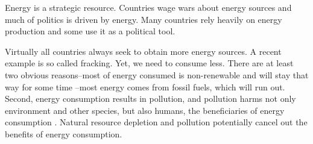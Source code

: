 \documentclass[10pt, letterpaper]{article}
\begin{document}
\begin{spacing}{1.4}

 Energy is a strategic
resource. Countries wage wars about energy sources  and much of politics is
driven by energy. %
Many  countries rely heavily on energy production
and some use it as a political tool.%

Virtually all countries  always seek to obtain more energy sources. A recent example is so called
fracking. Yet, we need to consume less. There are at least two
obvious reasons--most of energy consumed  is non-renewable and will stay
that way for some time \cite{mackay08}--most energy comes from
fossil fuels, which will run out. %
Second, energy consumption results in pollution, and pollution harms not only
 environment and other species, but also  humans, the beneficiaries of energy
consumption \cite{mackerron09,gandelman12,ferreira13}. Natural resource
depletion and pollution potentially cancel out the benefits of energy
consumption. 
 

\end{spacing}
\end{document}
